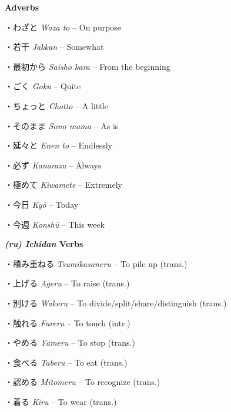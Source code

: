 \par{\textbf{Adverbs }}

\par{・わざと \emph{Waza to }– On purpose }

\par{・若干 \emph{Jakkan }– Somewhat }

\par{・最初から \emph{Saisho kara }– From the beginning }

\par{・ごく \emph{Goku }– Quite }

\par{・ちょっと \emph{Chotto }– A little }

\par{・そのまま \emph{Sono mama }– As is }

\par{・延々と \emph{En\textquotesingle en to }– Endlessly }

\par{・必ず \emph{Kanarazu }– Always }

\par{・極めて \emph{Kiwamete }– Extremely }

\par{・今日 \emph{Kyō }– Today }

\par{・今週 \emph{Konshū }– This week }

\par{\textbf{\emph{(ru) Ichidan }Verbs }}

\par{・積み重ねる \emph{Tsumikasaneru }– To pile up (trans.) }

\par{・上げる \emph{Ageru }– To raise (trans.) }

\par{・別ける \emph{Wakeru }– To divide\slash split\slash share\slash distinguish (trans.) }

\par{・触れる \emph{Fureru }– To touch (intr.) }

\par{・やめる \emph{Yameru }– To stop (trans.) }

\par{・食べる \emph{Taberu }– To eat (trans.) }

\par{・認める \emph{Mitomeru }– To recognize (trans.) }

\par{・着る \emph{Kiru }– To wear (trans.) }

